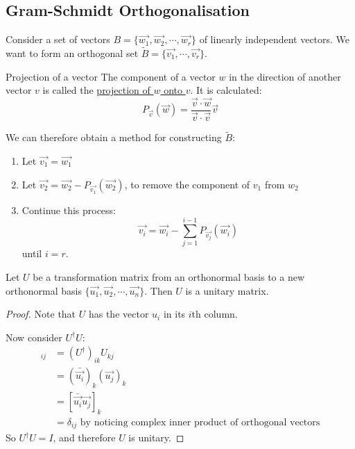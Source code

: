\documentclass[../Main.tex]{subfiles}
\begin{document}
\subsection{Gram-Schmidt Orthogonalisation}
Consider a set of vectors $B = \{\vec{w_1}, \vec{w_2}, \cdots, \vec{w_r}\}$ of linearly independent vectors. We want to form an orthogonal set $\tilde{B} = \{\vec{v_1}, \cdots, \vec{v_r}\}$.\par
\begin{definition}{Projection of a vector}
    The component of a vector $w$ in the direction of another vector $v$ is called the \underline{projection of $w$ onto $v$}. It is calculated:
    \begin{equation}
        P_{\vec{v}}(\vec{w}) = \frac{\vec{v} \cdot \vec{w}}{\vec{v} \cdot \vec{v}} \vec{v}
        \label{eqnVecProjection}
    \end{equation}
\end{definition}
We can therefore obtain a method for constructing $\tilde{B}$:
\begin{enumerate}
    \item Let $\vec{v_1} = \vec{w_1}$
    \item Let $\vec{v_2} = \vec{w_2} - P_{\vec{v_1}}(\vec{w_2})$, to remove the component of $v_1$ from $w_2$
    \item Continue this process:
        \begin{equation*}
            \vec{v_i} = \vec{w_i} - \sum_{j=1}^{i-1} P_{\vec{v_j}}(\vec{w_i})
        \end{equation*}
        until $i = r$.
\end{enumerate}
\begin{proposition}
    Let $U$ be a transformation matrix from an orthonormal basis to a new orthonormal basis $\{\vec{u_1}, \vec{u_2}, \cdots, \vec{u_n}\}$. Then $U$ is a unitary matrix.
    \label{propUnitaryTransform}
\end{proposition}
\begin{proof}
    Note that $U$ has the vector $u_i$ in its $i$th column.\par
    Now consider $U^\dagger U$:
    \begin{align*}
        [U^\dagger U]_{ij} &= (U^\dagger)_{ik} U_{kj} \\
        &= (\bar{\vec{u_i}})_k (\vec{u_j})_k \\
        &= [\bar{\vec{u_i}} \vec{u_j}]_k \\
        &= \delta_{ij} \text{ by noticing complex inner product of orthogonal vectors}
    \end{align*}
    So $U^\dagger U = I$, and therefore $U$ is unitary.
\end{proof}
\end{document}
